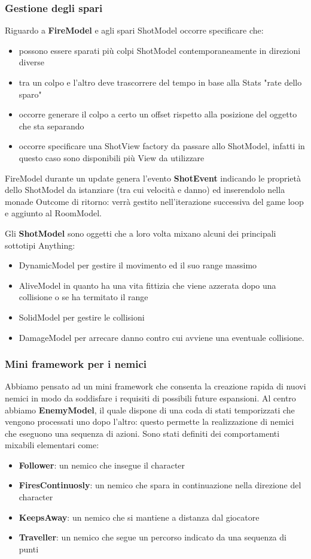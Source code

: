 \subsubsection{Gestione degli spari}
Riguardo a \textbf{FireModel} e agli spari ShotModel occorre specificare che:
\begin{itemize}
    \item possono essere sparati più colpi ShotModel contemporaneamente in direzioni diverse
    \item tra un colpo e l'altro deve trascorrere del tempo in base alla Stats "rate dello sparo"
    \item occorre generare il colpo a certo un offset rispetto alla posizione del oggetto che sta separando
    \item occorre specificare una ShotView factory da passare allo ShotModel, infatti in questo caso sono disponibili più View da utilizzare
\end{itemize}

FireModel durante un update genera l'evento \textbf{ShotEvent} indicando le proprietà dello ShotModel da istanziare (tra cui velocità e danno) ed inserendolo nella monade Outcome di ritorno: verrà gestito nell'iterazione successiva del game loop e aggiunto al RoomModel.

Gli \textbf{ShotModel} sono oggetti che a loro volta mixano alcuni dei principali sottotipi Anything: 
\begin{itemize}
	\item DynamicModel per gestire il movimento ed il suo range massimo
	\item AliveModel in quanto ha una vita fittizia che viene azzerata dopo una collisione o se ha termitato il range 
	\item SolidModel per gestire le collisioni
	\item DamageModel per arrecare danno contro cui avviene una eventuale collisione.
\end{itemize}

\subsubsection{Mini framework per i nemici}

Abbiamo pensato ad un mini framework che consenta la creazione rapida di nuovi nemici in modo da soddisfare i requisiti di possibili future espansioni.
Al centro abbiamo \textbf{EnemyModel}, il quale dispone di una coda di stati temporizzati che vengono processati uno dopo l'altro: questo permette la realizzazione di nemici che eseguono una sequenza di azioni.
Sono stati definiti dei comportamenti mixabili elementari come:
\begin{itemize}
    \item \textbf{Follower}: un nemico che insegue il character
    \item \textbf{FiresContinuosly}: un nemico che spara in continuazione nella direzione del character
    \item \textbf{KeepsAway}: un nemico che si mantiene a distanza dal giocatore
    \item \textbf{Traveller}: un nemico che segue un percorso indicato da una sequenza di punti
\end{itemize}

